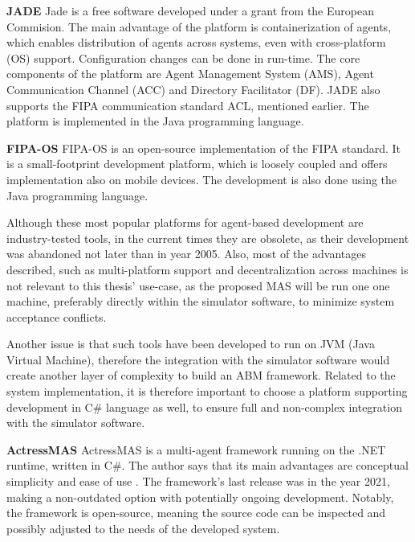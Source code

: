 \documentclass[main.tex]{subfiles}
\begin{document}
\textbf{JADE} \smallskip \newline 
Jade is a free software developed under a grant from the European Commision. The main advantage of the 
platform is containerization of agents, which enables distribution of agents across systems, even 
with cross-platform (OS) support. Configuration changes can be done in run-time. The core components of 
the platform are Agent Management System (AMS), Agent Communication Channel (ACC) and Directory Facilitator (DF). 
JADE also supports the FIPA communication standard ACL, mentioned earlier. The platform is implemented in 
the Java programming language.

\textbf{FIPA-OS} \smallskip \newline 
FIPA-OS is an open-source implementation of the FIPA standard. It is a small-footprint development platform, 
which is loosely coupled and offers implementation also on mobile devices. The development is also done 
using the Java programming language. 

Although these most popular platforms for agent-based development are industry-tested tools, in the current 
times they are obsolete, as their development was abandoned not later than in year 2005. Also, most of the 
advantages described, such as multi-platform support and decentralization across machines is not relevant to 
this thesis' use-case, as the proposed MAS will be run one one machine, preferably directly within the simulator 
software, to minimize system acceptance conflicts. 

Another issue is that such tools have been developed to run on JVM (Java Virtual Machine), therefore the integration 
with the simulator software would create another layer of complexity to build an ABM framework. 
Related to the system implementation, it is therefore important to choose a platform supporting 
development in C\# language as well, to ensure full and non-complex integration with the simulator 
software.

\textbf{ActressMAS} \smallskip \newline
ActressMAS is a multi-agent framework running on the .NET runtime, written in C\#. The author says that 
its main advantages are conceptual simplicity and ease of use \cite{Leon2022}. The framework's last release was 
in the year 2021, making a non-outdated option with potentially ongoing development. Notably, the framework is 
open-source, meaning the source code can be inspected and possibly adjusted to the needs of the developed system.
\end{document}
